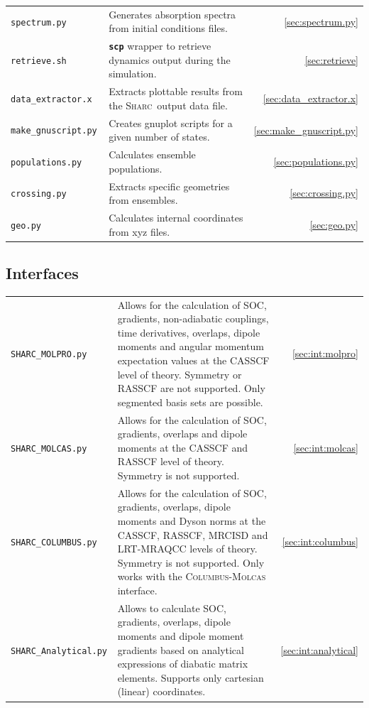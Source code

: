 \documentclass[a4paper,11pt,DIV=15,openany,twoside=false]{scrbook}
\newcommand{\sharc}{\textsc{Sharc}}
\newcommand{\todo}[1]{\textcolor{RL}{#1}}
\newcommand{\ttt}[1]{\textbf{\texttt{#1}}}
\begin{document}
\begin{tabular}{>{\tt}lp{9.5cm}r}
  spectrum.py           &Generates absorption spectra from initial conditions files.            &\ref{sec:spectrum.py}\\
  retrieve.sh           &\ttt{scp} wrapper to retrieve dynamics output during the simulation.   &\ref{sec:retrieve}\\
  data\_extractor.x     &Extracts plottable results from the \sharc\ output data file.          &\ref{sec:data_extractor.x}\\
  make\_gnuscript.py    &Creates gnuplot scripts for a given number of states.                  &\ref{sec:make_gnuscript.py}\\
  populations.py        &Calculates ensemble populations.                                       &\ref{sec:populations.py}\\
  crossing.py           &Extracts specific geometries from ensembles.                                          &\ref{sec:crossing.py}\\
  geo.py                &Calculates internal coordinates from xyz files.              &\ref{sec:geo.py}\\
\end{tabular}

\subsection{Interfaces}

\begin{tabular}{>{\tt}lp{9.5cm}r}
  SHARC\_MOLPRO.py      &Allows for the calculation of SOC, gradients, non-adiabatic couplings, time derivatives, overlaps, dipole moments and angular momentum expectation values at the CASSCF level of theory. Symmetry or RASSCF are not supported. Only segmented basis sets are possible.   &\ref{sec:int:molpro}\\
  SHARC\_MOLCAS.py      &Allows for the calculation of SOC, gradients, overlaps and dipole moments at the CASSCF and RASSCF level of theory. Symmetry is not supported.   &\ref{sec:int:molcas}\\
  SHARC\_COLUMBUS.py    &Allows for the calculation of SOC, gradients, overlaps, dipole moments and Dyson norms at the CASSCF, RASSCF, MRCISD and LRT-MRAQCC levels of theory. Symmetry is not supported. Only works with the \textsc{Columbus}-\textsc{Molcas} interface.                  &\ref{sec:int:columbus}\\
  SHARC\_Analytical.py  &Allows to calculate SOC, gradients, overlaps, dipole moments and dipole moment gradients based on analytical expressions of diabatic matrix elements. \todo{Supports only cartesian (linear) coordinates. }        &\ref{sec:int:analytical}\\
\end{tabular}
\end{document}
